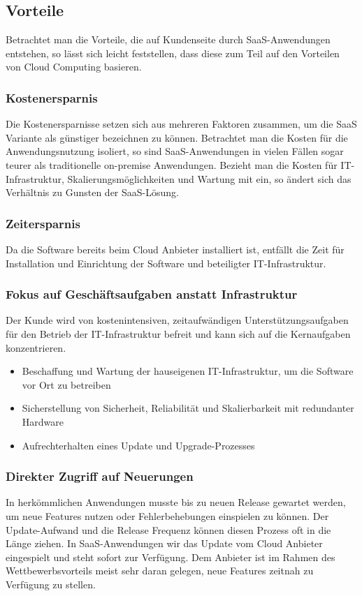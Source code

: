 \subsection{Vorteile}
Betrachtet man die Vorteile, die auf Kundenseite durch SaaS-Anwendungen entstehen, so lässt sich leicht feststellen, dass diese zum Teil auf den Vorteilen von Cloud Computing basieren.
\subsubsection{Kostenersparnis}
Die Kostenersparnisse setzen sich aus mehreren Faktoren zusammen, um die SaaS Variante als günstiger bezeichnen zu können. Betrachtet man die Kosten für die Anwendungsnutzung isoliert, so sind SaaS-Anwendungen in vielen Fällen sogar teurer als traditionelle on-premise Anwendungen. Bezieht man die Kosten für IT-Infrastruktur, Skalierungsmöglichkeiten und Wartung mit ein, so ändert sich das Verhältnis zu Gunsten der SaaS-Lösung.

\subsubsection{Zeitersparnis}
Da die Software bereits beim Cloud Anbieter installiert ist, entfällt die Zeit für Installation und Einrichtung der Software und beteiligter IT-Infrastruktur.

\subsubsection{Fokus auf Geschäftsaufgaben anstatt Infrastruktur}
Der Kunde wird von kostenintensiven, zeitaufwändigen Unterstützungsaufgaben für den Betrieb der IT-Infrastruktur befreit und kann sich auf die Kernaufgaben konzentrieren.
\begin{itemize}
	\item Beschaffung und Wartung der hauseigenen IT-Infrastruktur, um die Software vor Ort zu betreiben 
	\item Sicherstellung von Sicherheit, Reliabilität und Skalierbarkeit mit redundanter Hardware
	\item Aufrechterhalten eines Update und Upgrade-Prozesses
\end{itemize}

\subsubsection{Direkter Zugriff auf Neuerungen}
In herkömmlichen Anwendungen musste bis zu neuen Release gewartet werden, um neue Features nutzen oder Fehlerbehebungen einspielen zu können. Der Update-Aufwand und die Release Frequenz können diesen Prozess oft in die Länge ziehen. In SaaS-Anwendungen wir das Update vom Cloud Anbieter eingespielt und steht sofort zur Verfügung. Dem Anbieter ist im Rahmen des Wettbewerbsvorteils meist sehr daran gelegen, neue Features zeitnah zu Verfügung zu stellen.
 

